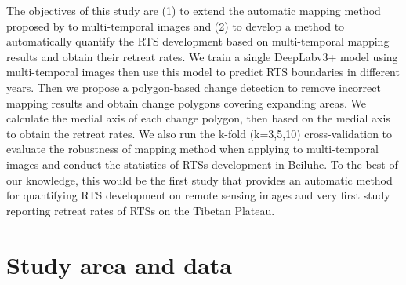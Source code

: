\documentclass[authoryear,preprint,review,12pt]{elsarticle}
\begin{document}

The objectives of this study are (1) to extend the automatic mapping method proposed by \cite{huang2020using} to multi-temporal images and (2) to develop a method to automatically quantify the RTS development based on multi-temporal mapping results and obtain their retreat rates. 
We train a single DeepLabv3+ model using multi-temporal images then use this model to predict RTS boundaries in different years.
Then we propose a polygon-based change detection to remove incorrect mapping results and obtain change polygons covering expanding areas.  
We calculate the medial axis of each change polygon, then based on the medial axis to obtain the retreat rates.  
We also run the k-fold (k=3,5,10) cross-validation to evaluate the robustness of mapping method when applying to multi-temporal images and conduct the statistics of RTSs development in Beiluhe. 
To the best of our knowledge, this would be the first study that provides an automatic method for quantifying RTS development on remote sensing images and very first study reporting retreat rates of RTSs on the Tibetan Plateau. 




\section{Study area and data}
\label{sec_studyarea_data}
\end{document}
